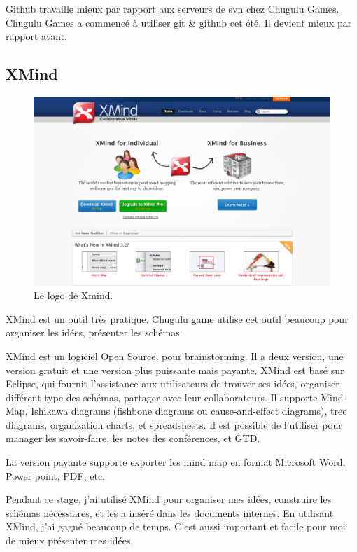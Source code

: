 Github travaille mieux par rapport aux serveurs de svn chez Chugulu Games. Chugulu Games a commencé à utiliser git \& github cet été. Il devient mieux par rapport avant.


\subsection{XMind} %


\begin{figure}[htbp]
	\centering
		\includegraphics[width=6in]{Image/Xmind.png}
	\caption{Le logo de Xmind.}
	\label{fig:Image_Xmind}
\end{figure}

XMind est un outil très pratique. Chugulu game utilise cet outil beaucoup pour organiser les idées, présenter les schémas. 

XMind est un logiciel Open Source, pour brainstorming. Il a deux version, une version gratuit et une version plus puissante mais payante. XMind est basé sur Eclipse, qui fournit l'assistance aux utilisateurs de trouver ses idées, organiser différent type des schémas, partager avec leur collaborateurs. Il supporte Mind Map, Ishikawa diagrams (fishbone diagrams ou cause-and-effect diagrams), tree diagrams, organization charts, et spreadsheets. Il est possible de l'utiliser pour manager les savoir-faire, les notes des conférences, et GTD. 

La version payante supporte exporter les mind map en format Microsoft Word, Power point, PDF, etc.

Pendant ce stage, j'ai utilisé XMind pour organiser mes idées, construire les schémas nécessaires, et les a inséré dans les documents internes. En utilisant XMind, j'ai gagné beaucoup de temps. C'est aussi important et facile pour moi de mieux présenter mes idées.

